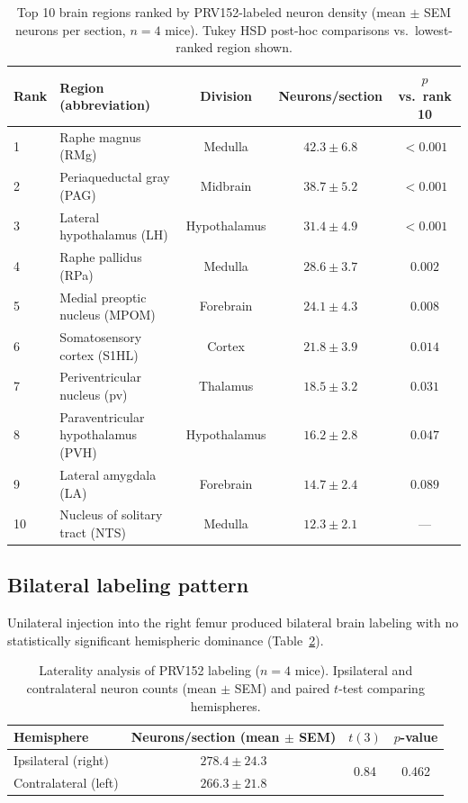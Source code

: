 \documentclass[11pt]{article}
\begin{document}
\begin{table}[H]
\centering
\caption{Top 10 brain regions ranked by PRV152-labeled neuron density (mean $\pm$ SEM neurons per section, $n = 4$ mice). Tukey HSD post-hoc comparisons vs.\ lowest-ranked region shown.}
\label{tab:top_regions}
\begin{tabular}{llccc}
\toprule
\textbf{Rank} & \textbf{Region (abbreviation)} & \textbf{Division} & \textbf{Neurons/section} & \textbf{$p$ vs.\ rank 10} \\
\midrule
1 & Raphe magnus (RMg) & Medulla & $42.3 \pm 6.8$ & $< 0.001$ \\
2 & Periaqueductal gray (PAG) & Midbrain & $38.7 \pm 5.2$ & $< 0.001$ \\
3 & Lateral hypothalamus (LH) & Hypothalamus & $31.4 \pm 4.9$ & $< 0.001$ \\
4 & Raphe pallidus (RPa) & Medulla & $28.6 \pm 3.7$ & $0.002$ \\
5 & Medial preoptic nucleus (MPOM) & Forebrain & $24.1 \pm 4.3$ & $0.008$ \\
6 & Somatosensory cortex (S1HL) & Cortex & $21.8 \pm 3.9$ & $0.014$ \\
7 & Periventricular nucleus (pv) & Thalamus & $18.5 \pm 3.2$ & $0.031$ \\
8 & Paraventricular hypothalamus (PVH) & Hypothalamus & $16.2 \pm 2.8$ & $0.047$ \\
9 & Lateral amygdala (LA) & Forebrain & $14.7 \pm 2.4$ & $0.089$ \\
10 & Nucleus of solitary tract (NTS) & Medulla & $12.3 \pm 2.1$ & --- \\
\bottomrule
\end{tabular}
\end{table}

\subsection{Bilateral labeling pattern}

Unilateral injection into the right femur produced bilateral brain labeling with no statistically significant hemispheric dominance (Table~\ref{tab:laterality}).

\begin{table}[H]
\centering
\caption{Laterality analysis of PRV152 labeling ($n = 4$ mice). Ipsilateral and contralateral neuron counts (mean $\pm$ SEM) and paired $t$-test comparing hemispheres.}
\label{tab:laterality}
\begin{tabular}{lccc}
\toprule
\textbf{Hemisphere} & \textbf{Neurons/section (mean $\pm$ SEM)} & \textbf{$t(3)$} & \textbf{$p$-value} \\
\midrule
Ipsilateral (right) & $278.4 \pm 24.3$ & \multirow{2}{*}{0.84} & \multirow{2}{*}{0.462} \\
Contralateral (left) & $266.3 \pm 21.8$ & & \\
\bottomrule
\end{tabular}
\end{table}
\end{document}
